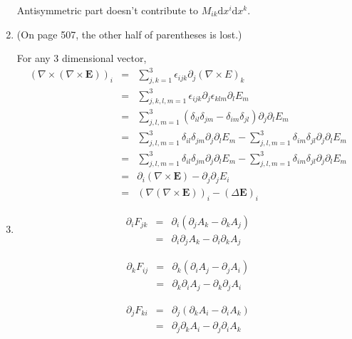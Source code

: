 \documentclass[12pt,a4paper]{article}
\begin{document}
\begin{enumerate}
Antisymmetric part doesn't contribute to $M_{ik}\mathrm dx^i\mathrm dx^k$.






\item

{\color{red}(On page 507, the other half of parentheses is lost.)}

For any 3 dimensional vector, 
\begin{eqnarray*}
	(\nabla\times(\nabla\times \bm E))_i&=&\sum_{j,k=1}^3\epsilon_{ijk}\partial_j(\nabla\times E)_k \\
	 &=& \sum_{j,k,l,m=1}^3 \epsilon_{ijk}\partial_j\epsilon_{klm}\partial_l E_m \\
	 &=&\sum_{j,l,m=1}^3 (\delta_{il}\delta_{jm} - \delta_{im}\delta_{jl})\partial_j\partial_l E_m \\
	 &=&\sum_{j,l,m=1}^3 \delta_{il}\delta_{jm}\partial_j\partial_l E_m  - \sum_{j,l,m=1}^3 \delta_{im}\delta_{jl}\partial_j\partial_l E_m \\
	 &=&\sum_{j,l,m=1}^3 \delta_{il}\delta_{jm}\partial_j\partial_l E_m  - \sum_{j,l,m=1}^3 \delta_{im}\delta_{jl}\partial_j\partial_l E_m \\
	 &=&\partial_i(\nabla\times \bm E) - \partial_j\partial_j E_i \\
	 &=&(\nabla(\nabla\times \bm E))_i - (\Delta \bm E)_i
\end{eqnarray*}





\item

\begin{eqnarray*}
	\partial_i F_{jk} &=& \partial_i (\partial_j A_k - \partial_k A_j) \\
	&=& \partial_i\partial_j A_k - \partial_i\partial_k A_j
\end{eqnarray*}


\begin{eqnarray*}
	\partial_k F_{ij} &=& \partial_k (\partial_i A_j - \partial_j A_i) \\
	&=& \partial_k\partial_i A_j - \partial_k\partial_j A_i
\end{eqnarray*}

\begin{eqnarray*}
	\partial_j F_{ki} &=& \partial_j (\partial_k A_i - \partial_i A_k) \\
	&=& \partial_j\partial_k A_i - \partial_j\partial_i A_k
\end{eqnarray*}



\end{enumerate}
\end{document}
